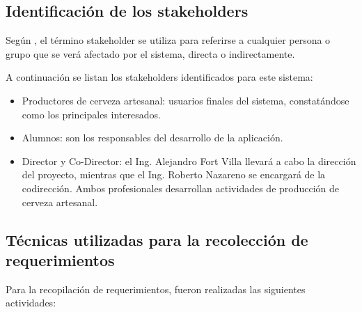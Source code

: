 \subsection{Identificación de los stakeholders}
\par
Según \cite{Som05}, el término stakeholder se utiliza para referirse a cualquier persona o grupo que se verá afectado por el sistema, directa o indirectamente. 
\par
A continuación se listan los stakeholders identificados para este sistema:
    \begin{itemize}
        \item Productores de cerveza artesanal: usuarios finales del sistema, constatándose como los principales interesados.
        \item Alumnos: son los responsables del desarrollo de la aplicación.
        \item Director y Co-Director: el Ing. Alejandro Fort Villa llevará a cabo la dirección del proyecto, mientras que el Ing. Roberto Nazareno se encargará de la codirección. Ambos profesionales desarrollan actividades de producción de cerveza artesanal.
    \end{itemize}
    
    \subsection{Técnicas utilizadas para la recolección de requerimientos}
    \par
    Para la recopilación de requerimientos, fueron realizadas las siguientes actividades:
    
